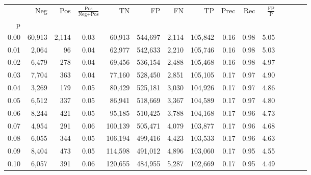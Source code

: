 \begin{tabular}{rrrcrrrrrrrrrrr}
\toprule
{} &     Neg &     Pos & $\frac{\text{Pos}}{\text{Neg}+\text{Pos}}$ &       TN &       FP &       FN &       TP &  Prec &   Rec & $\frac{\text{FP}}{\text{P}}$ \\
p    &         &         &                                            &          &          &          &          &       &       &                              \\
\midrule
0.00 &  60,913 &   2,114 &                                       0.03 &   60,913 &  544,697 &    2,114 &  105,842 &  0.16 &  0.98 &                         5.05 \\
0.01 &   2,064 &      96 &                                       0.04 &   62,977 &  542,633 &    2,210 &  105,746 &  0.16 &  0.98 &                         5.03 \\
0.02 &   6,479 &     278 &                                       0.04 &   69,456 &  536,154 &    2,488 &  105,468 &  0.16 &  0.98 &                         4.97 \\
0.03 &   7,704 &     363 &                                       0.04 &   77,160 &  528,450 &    2,851 &  105,105 &  0.17 &  0.97 &                         4.90 \\
0.04 &   3,269 &     179 &                                       0.05 &   80,429 &  525,181 &    3,030 &  104,926 &  0.17 &  0.97 &                         4.86 \\
0.05 &   6,512 &     337 &                                       0.05 &   86,941 &  518,669 &    3,367 &  104,589 &  0.17 &  0.97 &                         4.80 \\
0.06 &   8,244 &     421 &                                       0.05 &   95,185 &  510,425 &    3,788 &  104,168 &  0.17 &  0.96 &                         4.73 \\
0.07 &   4,954 &     291 &                                       0.06 &  100,139 &  505,471 &    4,079 &  103,877 &  0.17 &  0.96 &                         4.68 \\
0.08 &   6,055 &     344 &                                       0.05 &  106,194 &  499,416 &    4,423 &  103,533 &  0.17 &  0.96 &                         4.63 \\
0.09 &   8,404 &     473 &                                       0.05 &  114,598 &  491,012 &    4,896 &  103,060 &  0.17 &  0.95 &                         4.55 \\
0.10 &   6,057 &     391 &                                       0.06 &  120,655 &  484,955 &    5,287 &  102,669 &  0.17 &  0.95 &                         4.49 \\

\end{tabular}
